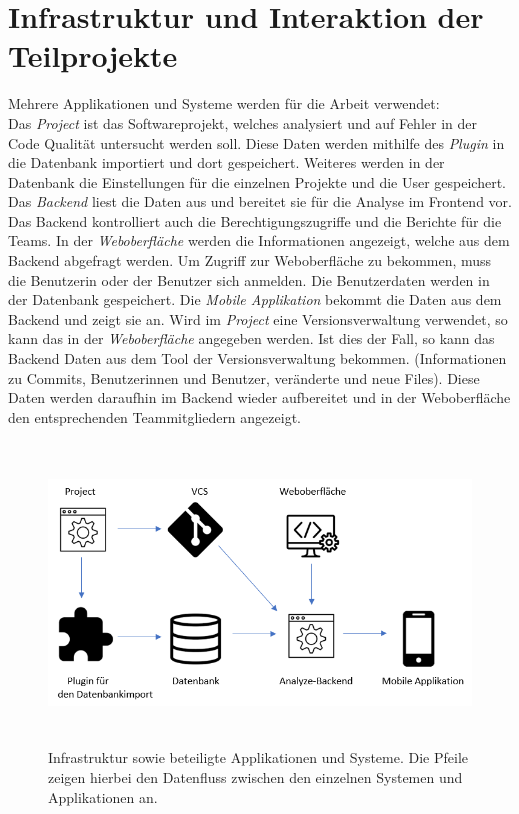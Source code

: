 \section{Infrastruktur und Interaktion der Teilprojekte}
Mehrere Applikationen und Systeme werden für die Arbeit verwendet: \\
Das \textit{Project} ist das Softwareprojekt, welches analysiert und auf Fehler in der Code Qualität untersucht werden soll. Diese Daten werden mithilfe des \textit{Plugin} in die Datenbank importiert und dort gespeichert. Weiteres werden in der Datenbank die Einstellungen für die einzelnen Projekte und die User gespeichert. Das \textit{Backend} liest die Daten aus und bereitet sie für die Analyse im Frontend vor. Das Backend kontrolliert auch die Berechtigungszugriffe und die Berichte für die Teams. In der \textit{Weboberfläche} werden die Informationen angezeigt, welche aus dem Backend abgefragt werden. Um Zugriff zur Weboberfläche zu bekommen, muss die Benutzerin oder der Benutzer sich anmelden. Die Benutzerdaten werden in der Datenbank gespeichert.
Die \textit{Mobile Applikation} bekommt die Daten aus dem Backend und zeigt sie an. Wird im \textit{Project} eine Versionsverwaltung verwendet, so kann das in der \textit{Weboberfläche} angegeben werden. Ist dies der Fall, so kann das Backend Daten aus dem Tool der Versionsverwaltung bekommen. (Informationen zu Commits, Benutzerinnen und Benutzer, veränderte und neue Files). Diese Daten werden daraufhin im Backend wieder aufbereitet und in der Weboberfläche den entsprechenden Teammitgliedern angezeigt.
\begin{figure}[tp]
  \centering
  \includegraphics[height=8cm]{images/infrastruktur.PNG}
 \caption[Infrastruktur und beteiligte Applikationen und Systeme]{Infrastruktur sowie beteiligte Applikationen und Systeme. Die Pfeile zeigen hierbei den Datenfluss zwischen den einzelnen Systemen und Applikationen an.}
  \label{fig:findingsInIDE}
\end{figure}
\chapterend